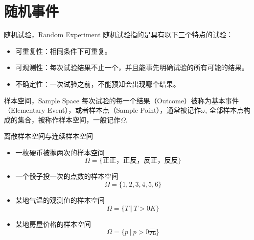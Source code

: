 
\section{随机事件}


\begin{frame}

\begin{block}{随机试验，Random Experiment}
随机试验指的是具有以下三个特点的试验：
\begin{itemize}
\item 可重复性：相同条件下可重复。
\item 可观测性：每次试验结果不止一个，并且能事先明确试验的所有可能的结果。
\item 不确定性：一次试验之前，不能预知会出现哪个结果。
\end{itemize}
\end{block}

\begin{block}{样本空间，Sample Space}
每次试验的每一个结果（Outcome）被称为基本事件（Elementary Event），或者样本点（Sample Point），通常被记作$\omega$, 全部样本点构成的集合，被称作样本空间，一般记作$\Omega$.
\end{block}

\end{frame}


\begin{frame}

\begin{block}{离散样本空间与连续样本空间}
\begin{itemize}
\item 一枚硬币被抛两次的样本空间
$$\Omega = \{\text{正正，正反，反正，反反}\}$$
\item 一个骰子投一次的点数的样本空间
$$\Omega = \{1,2,3,4,5,6\}$$
\pause
\item 某地气温的观测值的样本空间
$$\Omega = \{T \ |\ T > 0K\}$$
\item 某地房屋价格的样本空间
$$\Omega = \{p \ |\ p > 0\text{元}\}$$
\end{itemize}
\end{block}

\end{frame}


